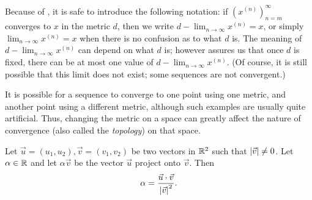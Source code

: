 \begin{note}
  Because of , it is safe to introduce the following notation:
  if \((x^{(n)})_{n = m}^\infty\) converges to \(x\) in the metric \(d\), then we write \(d - \lim_{n \to \infty} x^{(n)} = x\), or simply \(\lim_{n \to \infty} x^{(n)} = x\) when there is no confusion as to what \(d\) is.
  The meaning of \(d - \lim_{n \to \infty} x^{(n)}\) can depend on what \(d\) is;
  however  assures us that once \(d\) is fixed, there can be at most one value of \(d - \lim_{n \to \infty} x^{(n)}\).
  (Of course, it is still possible that this limit does not exist;
  some sequences are not convergent.)
\end{note}

\begin{rmk}\label{ii:1.1.21}
  It is possible for a sequence to converge to one point using one metric, and another point using a different metric, although such examples are usually quite artificial.
  Thus, changing the metric on a space can greatly affect the nature of convergence (also called the \emph{topology}) on that space.
\end{rmk}

\begin{ac}\label{ii:ac:1.1.1}
  Let \(\vec{u} = (u_1, u_2), \vec{v} = (v_1, v_2)\) be two vectors in \(\mathbb{R}^2\) such that \(\left\lvert\vec{v}\right\rvert \neq 0\).
  Let \(\alpha \in \mathbb{R}\) and let \(\alpha \vec{v}\) be the vector \(\vec{u}\) project onto \(\vec{v}\).
  Then
  \[
    \alpha = \dfrac{\vec{u} \cdot \vec{v}}{\left\lvert\vec{v}\right\rvert^2}.
  \]
\end{ac}

